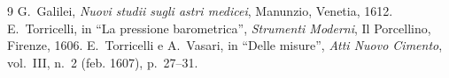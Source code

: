 \documentclass[%
corpo=12pt,
twoside,
stile=classica,
tipotesi=magistrale,
folioinhead,
]{toptesi}
\begin{document}
\begin{thebibliography}{9}
 G.~Galilei, {\em Nuovi studii sugli astri medicei}, Manunzio,
        Venetia, 1612.
 E.~Torricelli, in ``La pressione barometrica'', {\em Strumenti
        Moderni}, Il Porcellino, Firenze, 1606.
 E.~Torricelli e A.~Vasari, in ``Delle misure'', {\em Atti Nuovo
        Cimento}, vol.~III, n.~2 (feb. 1607), p.~27--31.
\end{thebibliography}
\end{document}
